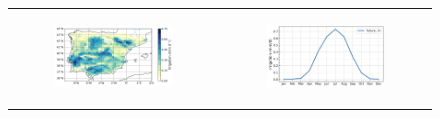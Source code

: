 \begin{figure}[htbp]
    \centering
    \begin{tabular}{cc}
        \begin{subfigure}[b]{0.48\textwidth}
            \caption{}
            \includegraphics[width=\textwidth]{images/chap4/future/map_irrigation_fut.png}
        \end{subfigure} &
        \begin{subfigure}[b]{0.46\textwidth}
            \caption{}
            \includegraphics[width=\textwidth]{images/chap4/future/SC_irrigation_fut.png}
        \end{subfigure}
    \end{tabular}
    \caption{}
    \label{fig:future_irrig}
\end{figure}

